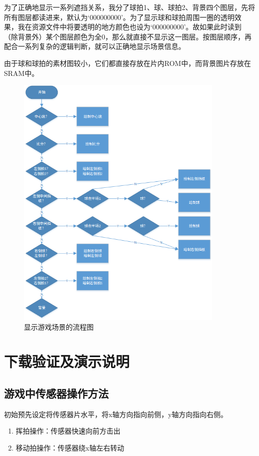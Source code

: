 \documentclass[UTF8]{article}
\begin{document}
为了正确地显示一系列遮挡关系，我分了球拍1、球、球拍2、背景四个图层，先将所有图层都读进来，默认为‘000000000’。为了显示球和球拍周围一圈的透明效果，我在资源文件中将要透明的地方颜色也设为‘000000000’。故如果此时读到（除背景外）某个图层颜色为全0，那么就直接不显示这一图层。按图层顺序，再配合一系列复杂的逻辑判断，就可以正确地显示场景信息。

由于球和球拍的素材图较小，它们都直接存放在片内ROM中，而背景图片存放在SRAM中。
\begin{figure}[H]
  \centering
  \includegraphics[width=10cm]{2-11.png}
  \caption{显示游戏场景的流程图}
\end{figure}

\section{下载验证及演示说明}
\subsection{游戏中传感器操作方法}
初始预先设定将传感器片水平，将x轴方向指向前侧，y轴方向指向右侧。
\begin{enumerate}
\item 挥拍操作：传感器快速向前方击出
\item 移动拍操作：传感器绕x轴左右转动
\end{enumerate}
\end{document}
